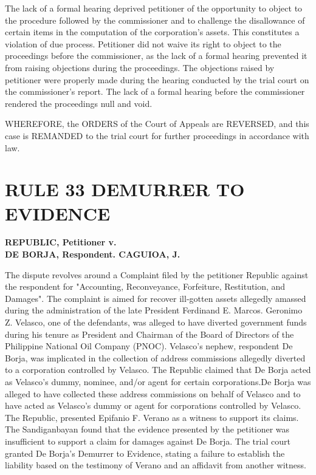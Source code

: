 \documentclass[
12pt,
oneside,
onehalfspacing,
headsepline
]{DigestCollection}
\begin{document}
The lack of a formal hearing deprived petitioner of the opportunity to object to the procedure followed by the commissioner and to challenge the disallowance of certain items in the computation of the corporation's assets. This constitutes a violation of due process. Petitioner did not waive its right to object to the proceedings before the commissioner, as the lack of a formal hearing prevented it from raising objections during the proceedings. The objections raised by petitioner were properly made during the hearing conducted by the trial court on the commissioner's report. The lack of a formal hearing before the commissioner rendered the proceedings null and void.

WHEREFORE, the ORDERS of the Court of Appeals are REVERSED, and this case is REMANDED to the trial court for further proceedings in accordance with law.

\chapter{RULE 33 DEMURRER TO EVIDENCE}
\label{939b4700-0a16-11ef-932c-63c852f65e48}


\label{2a073950-0a2c-11ef-a1a5-03b0bde1fccf}


\noindent\textbf{REPUBLIC, Petitioner v. \\DE BORJA, Respondent. CAGUIOA, J.}\vspace{0.4cm}

The dispute revolves around a Complaint filed by the petitioner Republic against the respondent for "Accounting, Reconveyance, Forfeiture, Restitution, and Damages". The complaint is aimed for recover ill-gotten assets allegedly amassed during the administration of the late President Ferdinand E. Marcos. Geronimo Z. Velasco, one of the defendants, was alleged to have diverted government funds during his tenure as President and Chairman of the Board of Directors of the Philippine National Oil Company (PNOC). Velasco's nephew, respondent De Borja, was implicated in the collection of address commissions allegedly diverted to a corporation controlled by Velasco. The Republic claimed that De Borja acted as Velasco's dummy, nominee, and/or agent for certain corporations.De Borja was alleged to have collected these address commissions on behalf of Velasco and to have acted as Velasco's dummy or agent for corporations controlled by Velasco. The Republic, presented Epifanio F. Verano as a witness to support its claims. The Sandiganbayan found that the evidence presented by the petitioner was insufficient to support a claim for damages against De Borja. The trial court granted De Borja's Demurrer to Evidence, stating a failure to establish the liability based on the testimony of Verano and an affidavit from another witness.
\end{document}
